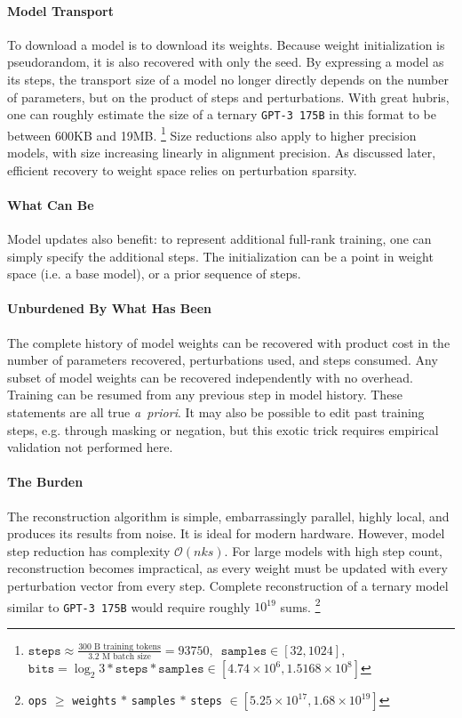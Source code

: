 \documentclass{article}
\begin{document}
\paragraph{Model Transport}
To download a model is to download its weights. 
Because weight initialization is \mbox{pseudorandom}, it is also recovered with only the seed.
By expressing a model as its steps, the transport size of a model no longer directly depends on the number of parameters, but on the product of steps and perturbations. 
With great hubris, one can roughly estimate the size of a ternary \texttt{GPT-3 175B} in this format to be between 600KB and 19MB.
\footnote{{
  $\texttt{steps} \approx \frac{\text{300 B training tokens}}{\text{3.2 M batch size}} = 93750, \,$
  $\texttt{samples} \in [32, 1024], \,$
  $\texttt{bits} = \log_{2}3 * \texttt{steps} * \texttt{samples} \in [4.74 \times 10^6, 1.5168 \times 10^8]$
}}
Size reductions also apply to higher precision models, with size increasing linearly in alignment precision. 
As discussed later, efficient recovery to weight space relies on perturbation sparsity.

\paragraph{What Can Be}
Model updates also benefit: to represent additional full-rank training, one can simply specify the additional steps. 
The initialization can be a point in weight space (i.e. a base model), or a prior sequence of steps.

\paragraph{Unburdened By What Has Been}
The complete history of model weights can be recovered with product cost in the number of parameters recovered, perturbations used, and steps consumed.
Any subset of model weights can be recovered independently with no overhead. Training can be resumed from any previous step in model history.
These statements are all true \textit{a~priori}.
It may also be possible to edit past training steps, e.g. through masking or negation, but this exotic trick requires empirical validation not performed here.

\paragraph{The Burden}
The reconstruction algorithm is simple, embarrassingly parallel, highly local, and produces its results from noise. It is ideal for modern hardware.
However, model step reduction has complexity $\mathcal{O}(nks)$.
For large models with high step count, reconstruction becomes impractical, as every weight must be updated with every perturbation vector from every step.
Complete reconstruction of a ternary model similar to \texttt{GPT-3 175B} would require roughly $10^{19}$ sums.
\footnote{
  \texttt{ops} $\ge$ \texttt{weights} $*$ \texttt{samples} $*$ \texttt{steps} $\in [5.25 \times 10^{17}, 1.68 \times 10^{19}]$
}
\end{document}
